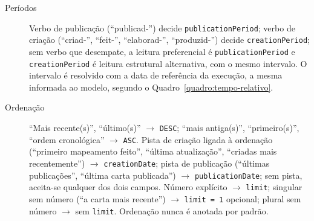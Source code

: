 \begin{description}
  \item[Períodos] Verbo de publicação (``publicad-'') decide \texttt{publicationPeriod}; verbo de criação (``criad-'', ``feit-'', ``elaborad-'', ``produzid-'') decide \texttt{creationPeriod}; sem verbo que desempate, a leitura preferencial é \texttt{publicationPeriod} e \texttt{creationPeriod} é leitura estrutural alternativa, com o mesmo intervalo. O intervalo é resolvido com a data de referência da execução, a mesma informada ao modelo, segundo o Quadro~\ref{quadro:tempo-relativo}.
  \item[Ordenação] ``Mais recente(s)'', ``último(s)'' $\to$ \texttt{DESC}; ``mais antiga(s)'', ``primeiro(s)'', ``ordem cronológica'' $\to$ \texttt{ASC}. Pista de criação ligada à ordenação (``primeiro mapeamento feito'', ``última atualização'', ``criadas mais recentemente'') $\to$ \texttt{creationDate}; pista de publicação (``últimas publicações'', ``última carta publicada'') $\to$ \texttt{publicationDate}; sem pista, aceita-se qualquer dos dois campos. Número explícito $\to$ \texttt{limit}; singular sem número (``a carta mais recente'') $\to$ \texttt{limit = 1} opcional; plural sem número $\to$ sem \texttt{limit}. Ordenação nunca é anotada por padrão.
\end{description}

